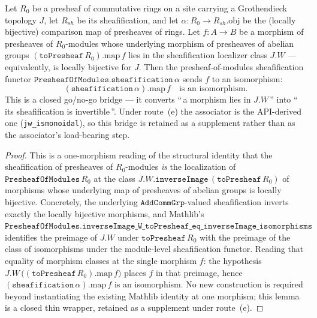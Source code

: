 \begin{lemma}

  \label{lem:isiso_sheafification_map_of_W}
  Let \(R_0\) be a presheaf of commutative rings on a site carrying a
  Grothendieck topology \(J\), let \(R_{sh}\) be its sheafification, and let
  \(\alpha : R_0 \to R_{sh}.\mathrm{obj}\) be the (locally bijective) comparison
  map of presheaves of rings. Let \(f : A \to B\) be a morphism of presheaves of
  \(R_0\)-modules whose underlying morphism of presheaves of abelian groups
  \((\mathtt{toPresheaf}\,R_0).\mathrm{map}\,f\) lies in the sheafification
  localizer class \(J.W\) --- equivalently, is locally bijective for \(J\). Then
  the presheaf-of-modules sheafification functor
  \(\mathtt{PresheafOfModules.sheafification}\,\alpha\) sends \(f\) to an
  isomorphism:
  \[
    (\mathtt{sheafification}\,\alpha).\mathrm{map}\,f
    \quad\text{is an isomorphism.}
  \]
  This is a closed go/no-go bridge --- it converts ``\,a morphism lies in
  \(J.W\)\,'' into ``\,its sheafification is invertible\,''. Under route~(e) the
  associator is the API-derived one (\texttt{jw\_ismonoidal}), so this bridge is
  retained as a supplement rather than as the associator's load-bearing step.
\end{lemma}

\begin{proof}

\leanok
  This is a one-morphism reading of the structural identity that the
  sheafification of presheaves of \(R_0\)-modules \emph{is} the localization of
  \(\mathtt{PresheafOfModules}\,R_0\) at the class
  \(J.W.\mathtt{inverseImage}\,(\mathtt{toPresheaf}\,R_0)\) of morphisms whose
  underlying map of presheaves of abelian groups is locally bijective. Concretely,
  the underlying \(\mathtt{AddCommGrp}\)-valued sheafification inverts exactly the
  locally bijective morphisms, and Mathlib's
  \(\mathtt{PresheafOfModules.inverseImage\_W\_toPresheaf\_eq\_inverseImage\_%
  isomorphisms}\) identifies the preimage of \(J.W\) under
  \(\mathtt{toPresheaf}\,R_0\) with the preimage of the class of isomorphisms under
  the module-level sheafification functor. Reading that equality of morphism
  classes at the single morphism \(f\): the hypothesis
  \(J.W\,\bigl((\mathtt{toPresheaf}\,R_0).\mathrm{map}\,f\bigr)\) places \(f\) in
  that preimage, hence \((\mathtt{sheafification}\,\alpha).\mathrm{map}\,f\) is an
  isomorphism. No new construction is required beyond instantiating the existing
  Mathlib identity at one morphism; this lemma is a closed thin wrapper, retained
  as a supplement under route~(e).
\end{proof}

